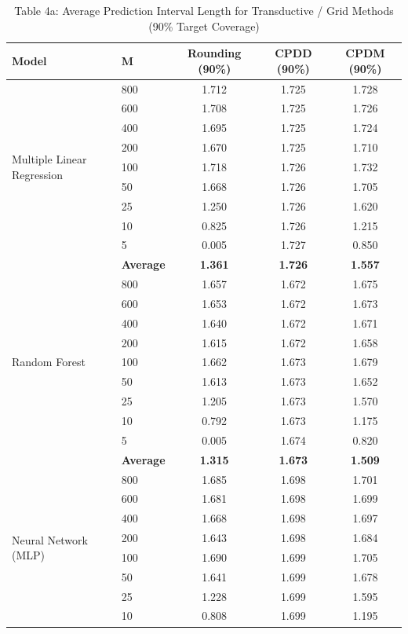 \documentclass[11pt,a4paper]{article}
\begin{document}
\begin{table}[H]
\centering
\caption{Table 4a: Average Prediction Interval Length for Transductive / Grid Methods (90\% Target Coverage)}
\label{tab:4a}
\scriptsize
\begin{tabular}{llccc}
\toprule
Model & M & Rounding (90\%) & CPDD (90\%) & CPDM (90\%) \\
\midrule
\multirow{9}{*}{Multiple Linear Regression}
 & 800 & 1.712 & 1.725 & 1.728 \\
 & 600 & 1.708 & 1.725 & 1.726 \\
 & 400 & 1.695 & 1.725 & 1.724 \\
 & 200 & 1.670 & 1.725 & 1.710 \\
 & 100 & 1.718 & 1.726 & 1.732 \\
 & 50  & 1.668 & 1.726 & 1.705 \\
 & 25  & 1.250 & 1.726 & 1.620 \\
 & 10  & 0.825 & 1.726 & 1.215 \\
 & 5   & 0.005 & 1.727 & 0.850 \\
 & \textbf{Average} & \textbf{1.361} & \textbf{1.726} & \textbf{1.557} \\
\midrule
\multirow{9}{*}{Random Forest}
 & 800 & 1.657 & 1.672 & 1.675 \\
 & 600 & 1.653 & 1.672 & 1.673 \\
 & 400 & 1.640 & 1.672 & 1.671 \\
 & 200 & 1.615 & 1.672 & 1.658 \\
 & 100 & 1.662 & 1.673 & 1.679 \\
 & 50  & 1.613 & 1.673 & 1.652 \\
 & 25  & 1.205 & 1.673 & 1.570 \\
 & 10  & 0.792 & 1.673 & 1.175 \\
 & 5   & 0.005 & 1.674 & 0.820 \\
 & \textbf{Average} & \textbf{1.315} & \textbf{1.673} & \textbf{1.509} \\
\midrule
\multirow{9}{*}{Neural Network (MLP)}
 & 800 & 1.685 & 1.698 & 1.701 \\
 & 600 & 1.681 & 1.698 & 1.699 \\
 & 400 & 1.668 & 1.698 & 1.697 \\
 & 200 & 1.643 & 1.698 & 1.684 \\
 & 100 & 1.690 & 1.699 & 1.705 \\
 & 50  & 1.641 & 1.699 & 1.678 \\
 & 25  & 1.228 & 1.699 & 1.595 \\
 & 10  & 0.808 & 1.699 & 1.195 \\

\end{tabular}
\end{table}
\end{document}
